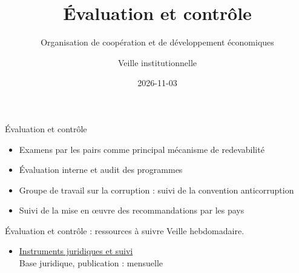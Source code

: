 \documentclass[aspectratio=169,11pt]{beamer}
\title{Évaluation et contrôle}
\subtitle{Organisation de coopération et de développement économiques}
\author{Veille institutionnelle}
\date{2026-11-03}
\begin{document}
\begin{frame}\titlepage\end{frame}

\begin{frame}{Évaluation et contrôle}
\begin{itemize}
\item Examens par les pairs comme principal mécanisme de redevabilité
\item Évaluation interne et audit des programmes
\item Groupe de travail sur la corruption : suivi de la convention anticorruption
\item Suivi de la mise en œuvre des recommandations par les pays
\end{itemize}
\end{frame}

\begin{frame}{Évaluation et contrôle : ressources à suivre}
\small
Veille hebdomadaire.
\begin{itemize}
\item \href{https://legalinstruments.oecd.org}{Instruments juridiques et suivi}\\{\footnotesize Base juridique, publication : mensuelle}
\end{itemize}
\end{frame}
\end{document}
